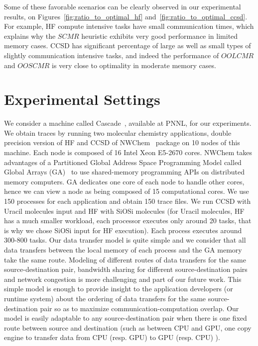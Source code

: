 \documentclass[sigconf]{acmart}
\begin{document}
{		Some of these favorable scenarios can be clearly observed in our experimental results, on Figures~\ref{fig:ratio_to_optimal_hf} and~\ref{fig:ratio_to_optimal_ccsd}. For example, HF compute intensive tasks have small communication times, which explains why the $SCMR$ heuristic exhibits very good performance in limited memory cases. CCSD has significant percentage of large as well as small types of slightly communication intensive tasks, and indeed the performance of $OOLCMR$ and $OOSCMR$ is very close to optimality in moderate memory cases. 
		
		\section{Experimental Settings}
		\label{sec:expSetting}
		
		We consider a machine called Cascade~\cite{Cascade}, available at PNNL, for our experiments. We obtain traces by running two molecular chemistry applications, double precision version of  HF and CCSD of NWChem~\cite{NWChem} package on 10 nodes of this machine. Each node is composed of 16 Intel Xeon E5-2670 cores. NWChem takes advantages of a Partitioned Global Address Space Programming Model called Global Arrays (GA)~\cite{GlobalArray} to use shared-memory programming APIs on distributed memory computers. GA dedicates one core of each node to handle other cores, hence we can view a node as being composed of 15 computational cores. We use 150 processes for each application and obtain 150 trace files. We run CCSD with Uracil molecules input and HF with SiOSi molecules (for Uracil molecules, HF has a much smaller workload, each processor executes only around 20 tasks, that is why we chose SiOSi input for HF execution). Each process executes around 300-800 tasks. Our data transfer model is quite simple and we consider that all data transfers between the local memory of each process and the GA memory take the same route. Modeling of different routes of data transfers for the same source-destination pair, bandwidth sharing for different source-destination pairs and network congestion is more challenging and part of our future work. This simple model is enough to provide insight to the application developers (or runtime system) about the ordering of data transfers for the same source-destination pair so as to maximize communication-computation overlap. Our model is easily adaptable to any source-destination pair when there is one fixed route between source and destination (such as between CPU and GPU, one copy engine to transfer data from CPU (resp. GPU) to GPU (resp. CPU) ).
		
}
\end{document}
